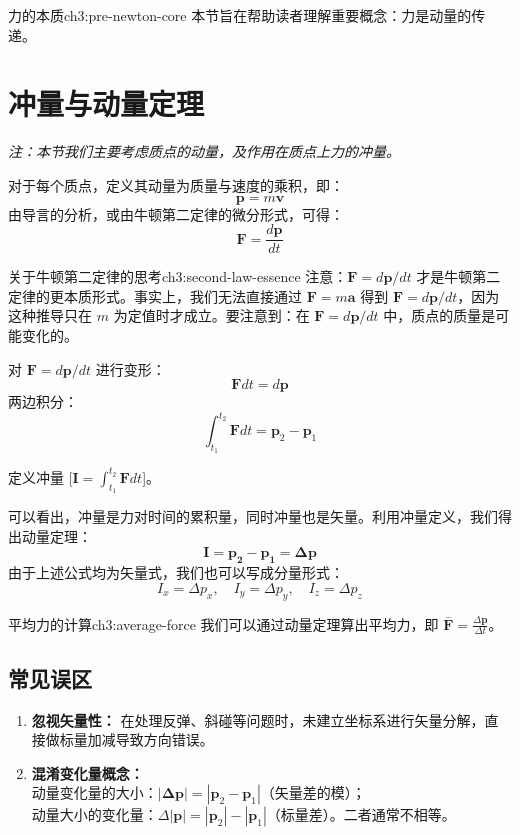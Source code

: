 	\begin{knowledge}{力的本质}{ch3:pre-newton-core}
		本节旨在帮助读者理解重要概念：力是动量的传递。
	\end{knowledge}
	
	\section{冲量与动量定理}
	\textit{注：本节我们主要考虑质点的动量，及作用在质点上力的冲量。}
	
	\vspace{1em} 
	\noindent 对于每个质点，定义其动量为质量与速度的乘积，即：
	\[ \boldsymbol{p} = m\boldsymbol{v} \]
	\noindent 由导言的分析，或由牛顿第二定律的微分形式，可得：
	\[ \boxed{\boldsymbol{F} = \frac{d\boldsymbol{p}}{dt}} \]
	
	\begin{knowledge}{关于牛顿第二定律的思考}{ch3:second-law-essence}
		注意：$\boldsymbol{F} = d\boldsymbol{p}/dt$ 才是牛顿第二定律的更本质形式。事实上，我们无法直接通过 $\boldsymbol{F}=m\boldsymbol{a}$ 得到 $\boldsymbol{F}=d\boldsymbol{p}/dt$，因为这种推导只在 $m$ 为定值时才成立。要注意到：在 $\boldsymbol{F}=d\boldsymbol{p}/dt$ 中，质点的质量是可能变化的。
	\end{knowledge}
	
	\noindent 对 $\boxed{\boldsymbol{F} = d\boldsymbol{p}/dt}$ 进行变形：
	\[ \boldsymbol{F}dt = d\boldsymbol{p} \]
	两边积分：
	\[ \int_{t_1}^{t_2} \boldsymbol{F} dt = \boldsymbol{p}_2 - \boldsymbol{p}_1 \]
	
	\noindent 定义冲量 [$\boldsymbol{I} = \int_{t_1}^{t_2} \boldsymbol{F} dt$]。
	
	\noindent 可以看出，冲量是力对时间的累积量，同时冲量也是矢量。利用冲量定义，我们得出动量定理：
	\[ \boxed{\boldsymbol{\boldsymbol{I} = \boldsymbol{p}_2 - \boldsymbol{p}_1 = \Delta \boldsymbol{p}}} \]
	由于上述公式均为矢量式，我们也可以写成分量形式：
	\[ I_x = \Delta p_x, \quad I_y = \Delta p_y, \quad I_z = \Delta p_z \]
	
	\begin{knowledge}{平均力的计算}{ch3:average-force}
		我们可以通过动量定理算出平均力，即 $\bar{\boldsymbol{F}} = \frac{\Delta \boldsymbol{p}}{\Delta t}$。
	\end{knowledge}
	
	\subsection*{常见误区}
	\begin{enumerate}
		\item \textbf{忽视矢量性：} 在处理反弹、斜碰等问题时，未建立坐标系进行矢量分解，直接做标量加减导致方向错误。
		\item \textbf{混淆变化量概念：} \\
		动量变化量的大小：$|\boldsymbol{\Delta p}| = |\boldsymbol{p}_2 - \boldsymbol{p}_1|$（矢量差的模）；\\
		动量大小的变化量：$\Delta|\boldsymbol{p}|  = |\boldsymbol{p}_2| - |\boldsymbol{p}_1|$（标量差）。二者通常不相等。
	\end{enumerate}
	
